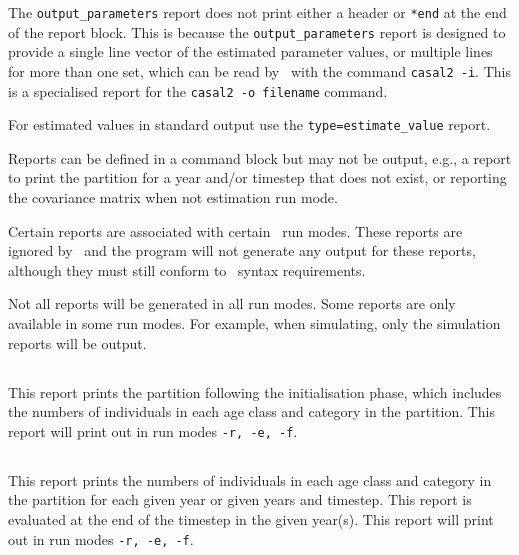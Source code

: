 The \texttt{output\_parameters} report does not print either a header or \texttt{*end} at the end of the report block. This is because the \texttt{output\_parameters} report is designed to provide a single line vector of the estimated parameter values, or multiple lines for more than one set, which can be read by \CNAME\ with the command \texttt{casal2 -i}. This is a specialised report for the \texttt{casal2 -o filename} command.

For estimated values in standard output use the \texttt{type=estimate\_value} report.

Reports can be defined in a  command block but may not be output, e.g., a report to print the partition for a year and/or timestep that does not exist, or reporting the covariance matrix when not estimation run mode.

Certain reports are associated with certain \CNAME\ run modes. These reports are ignored by \CNAME\ and the program will not generate any output for these reports, although they must still conform to \CNAME\ syntax requirements.

Not all reports will be generated in all run modes. Some reports are only available in some run modes. For example, when simulating, only the simulation reports will be output.

\subsection{}

This report prints the partition following the initialisation phase, which includes the numbers of individuals in each age class and category in the partition. This report will print out in run modes \texttt{-r, -e, -f}.

\subsection{}

This report prints the numbers of individuals in each age class and category in the partition for each given year or given years and timestep. This report is evaluated at the end of the timestep in the given year(s). This report will print out in run modes \texttt{-r, -e, -f}.

\subsection{}

